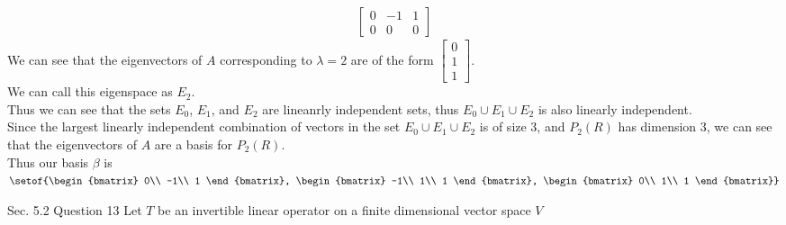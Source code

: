 \documentclass[answers,12pt,addpoints]{exam}
\begin{document}
\begin{questions}
\begin{solution}
\begin{align*}
\begin{bmatrix}
                0 & -1 & 1\\
                0 & 0 & 0
            \end{bmatrix}
        \end{align*}
        We can see that the eigenvectors of $A$ corresponding to $\lambda = 2$ are of the form $\begin{bmatrix}
            0\\
            1\\
            1
        \end{bmatrix}$.\\
        We can call this eigenspace as $E_{2}$.\\
        Thus we can see that the sets $E_{0}$, $E_{1}$, and $E_{2}$ are lineanrly independent sets, thus $E_{0} \cup E_{1} \cup E_{2}$ is also linearly independent. \\
        Since the largest linearly independent combination of vectors in the set $E_{0} \cup E_{1} \cup E_{2}$ is of size 3, and $P_2(R)$ has dimension 3, we can see that the eigenvectors of $A$ are a basis for $P_2(R)$.\\
        Thus our basis $\beta$ is $\setof{\begin{bmatrix}
            0\\
            -1\\
            1
        \end{bmatrix}, \begin{bmatrix}
            -1\\
            1\\
            1
        \end{bmatrix}, \begin{bmatrix}
            0\\
            1\\
            1
        \end{bmatrix}}$
    \end{solution}
    
    
    \question[10] Sec. 5.2 Question 13
    Let $T$ be an invertible linear operator on a finite dimensional vector space $V$
\end{questions}
\end{document}
